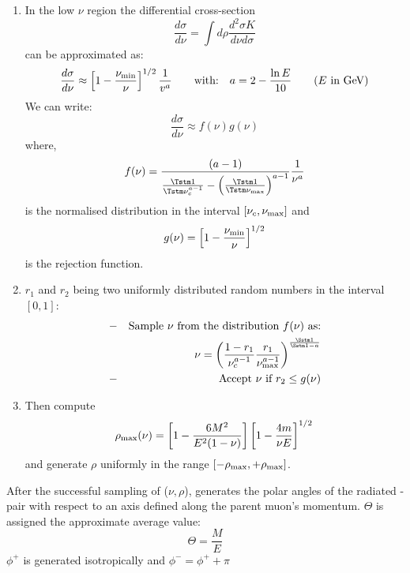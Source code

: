 \begin{enumerate}
\item
In the low $\nu$ region the differential cross-section
\[
\frac{d \sigma}{d\nu}=\int d \rho \frac{d^2 \sigma K} {d\nu d\sigma}
\]
can be approximated as:
\begin{equation}
\frac{d \sigma}{d\nu} \approx  \left[1-\frac{\nu_{\rm min}}{\nu}\right]^{1/2}
      \frac{1}{v^a} \mbox{\qquad with:\quad}
a = 2-\frac{\ln E}{10} \mbox{\qquad($E$ in GeV)}
\end{equation}
We can write:
\begin{equation}
 \frac{d \sigma}{d\nu}\approx f(\nu) g(\nu)
\end{equation}
where,
\begin{equation}
f(\nu) = \frac{(a-1)}{\frac{\Tstm 1}{\Tstm \nu_c^{a- 1}}  -
        \left(\frac{\Tstm 1}{\Tstm \nu_{\rm max}}\right)^{a-1}}
        \frac{1}{\nu^a}
\end{equation}
is the normalised distribution in the interval $[\nu_c,\nu_{\rm max}]$ and
\begin{equation}
g(\nu) = \left[1-\frac{\nu_{\rm min}}{\nu}\right]^{1/2}
\end{equation}
is the rejection function.
\item
$r_1$ and $r_2$ being two uniformly distributed random numbers in the
interval $[0,1]$:
\begin{eqnarray}
& - & \mbox{Sample $\nu$ from the distribution $f(\nu)$ as:}\nonumber      \\
&   & \nu = \left(\frac{1-r_1}{\nu_c^{a-1}} \frac{r_1}{\nu_{\rm max}^{a-1}}
      \right)^\frac{\Sstm 1}{\Sstm 1-a}                                    \\
& - & \mbox{Accept $\nu$ if $r_2 \leq g(\nu)$}
\end{eqnarray}
\item Then compute
\begin{equation}
\rho_{\rm max}(\nu) = \left[1 -\frac{6M^2}
      {E^2(1-\nu)}\right]\left[1-\frac{4m}{\nu E}\right]^{1/2} \\
\end{equation}
and generate $\rho $ uniformly in the range $[-\rho_{\rm max},
+\rho_{\rm max}]$.
\end{enumerate}
After the successful sampling of ($ \nu,\rho $),  generates the
polar
angles of the radiated \Pep\Pem-pair with respect to
an axis defined along the parent
muon's momentum. $\Theta$ is assigned the approximate average value:
\begin{equation}
 \Theta =\frac{M}{E}
\end{equation}
$\phi^+$ is generated isotropically and $\phi^- = \phi^+ + \pi$
